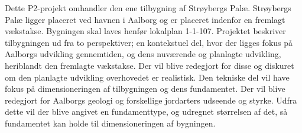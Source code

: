 Dette P2-projekt omhandler den ene tilbygning af Strøybergs Palæ.
\newline
\newline
Strøybergs Palæ ligger placeret ved havnen i Aalborg og er placeret indenfor en fremlagt vækstakse. Bygningen skal laves henfør lokalplan 1-1-107. Projektet beskriver tilbygningen ud fra to perspektiver; en kontekstuel del, hvor der ligges fokus på Aalborgs udvikling gennemtiden, og dens nuværende og planlagte udvikling, heriblandt den fremlagte vækstakse. Der vil blive redegjort for disse og diskuret om den planlagte udvikling overhovedet er realistisk. Den tekniske del vil have fokus på dimensioneringen af tilbygningen og dens fundamentet. Der vil blive redegjort for Aalborgs geologi og forskellige jordarters udseende og styrke. Udfra dette vil der blive angivet en fundamenttype, og udregnet størrelsen af det, så fundamentet kan holde til dimensioneringen af bygningen.     
